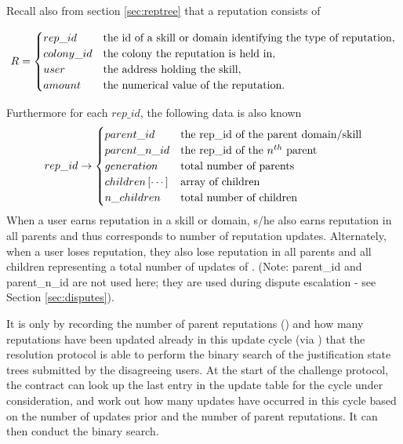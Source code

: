 Recall also from section \ref{sec:reptree} that a reputation consists of
\begin{center}
\[
R = 
\begin{cases}
 rep\_id & \textnormal{the id of a skill or domain identifying the type of reputation},\\
 colony\_id & \textnormal{the colony the reputation is held in},\\
 user & \textnormal{the address holding the skill},\\
 amount & \textnormal{the numerical value of the reputation}.
\end{cases}
\]
\end{center}


Furthermore for each $rep\_id$, the following data is also known
\[
  rep\_id \rightarrow 
  \begin{cases}
    parent\_id &	\textnormal{the rep\_id of the parent domain/skill}\\
    parent\_n\_id &	\textnormal{the rep\_id of the $n^{th}$ parent}\\
    generation &	\textnormal{total number of parents}\\
    children\left[\cdots\right] &	\textnormal{array of children}\\
    n\_children &	\textnormal{total number of children}
  \end{cases}
\]
When a user earns reputation in a skill or domain, s/he also earns reputation in all parents and thus corresponds to  number of reputation updates. Alternately, when a user loses reputation, they also lose reputation in all parents and all children representing a total number of updates of . (Note: parent\_id and parent\_n\_id are not used here; they are used during dispute escalation - see Section \ref{sec:disputes}).

It is only by recording the number of parent reputations () and how many reputations have been updated already in this update cycle (via ) that the resolution protocol is able to perform the binary search of the justification state trees submitted by the disagreeing users. At the start of the challenge protocol, the contract can look up the last entry in the update table for the cycle under consideration, and work out how many updates have occurred in this cycle based on the number of updates prior and the number of parent reputations. It can then conduct the binary search.

